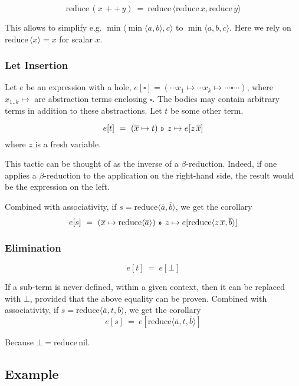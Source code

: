 \documentclass{article}
\begin{document}
\[\mathrm{reduce}\,(x {\scriptstyle\,++\,} y) ~=~ \mathrm{reduce}\,\langle \mathrm{reduce}\,x, \mathrm{reduce}\,y\rangle\]

This allows to simplify e.g. $\min\langle \min\langle a,b\rangle, c\rangle$ to $\min\langle a,b,c\rangle$.
Here we rely on $\mathrm{reduce}\,\langle x\rangle=x$ for scalar $x$.

\subsubsection{Let Insertion}

Let $e$ be an expression with a hole, $e[\square] = (\cdots x_1 \mapsto \cdots x_k\mapsto \cdots \square \cdots)$, 
where $x_{1..k}\mapsto$ are abstraction terms enclosing $\square$. The bodies may contain arbitrary terms
in addition to these abstractions. Let $t$ be some other term.

\[e[t] ~=~ (\overline{x}\mapsto t) ~\applt~ z\mapsto e[z\,\overline{x}]\]
%
where $z$ is a fresh variable.

\medskip
This tactic can be thought of as the inverse of a $\beta$-reduction. Indeed, if one applies a
$\beta$-reduction to the application on the right-hand side, the result would be the expression
on the left.

\medskip
Combined with associativity, if $s = \mathrm{reduce}\langle\overline{a},\overline{b}\rangle$,
we get the corollary
%
\[e[s] ~=~ (\overline{x}\mapsto \mathrm{reduce}\langle\overline a\rangle) ~\applt~ 
  z\mapsto e[\mathrm{reduce}\langle z\,\overline{x}, \overline{b}\rangle]\]


\subsubsection{Elimination}

\[e[t] ~=~ e[\bot]\]

If a sub-term is never defined, within a given context, then it can be replaced with $\bot$,
provided that the above equality can be proven.
\medskip
Combined with associativity, if $s = \mathrm{reduce}\langle\overline{a},t,\overline{b}\rangle$,
we get the corollary
%
\[e[s] ~=~ e[\mathrm{reduce}\langle\overline{a},t,\overline{b}\rangle]\]

Because $\bot = \mathrm{reduce}\,\mathrm{nil}$.

\subsection{Example}
\end{document}
